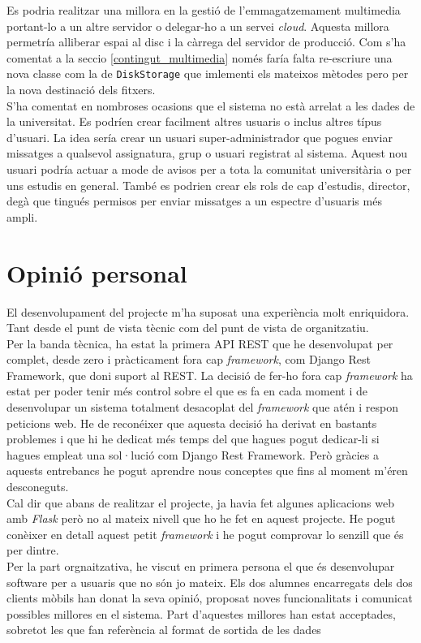 Es podria realitzar una millora en la gestió de  l'emmagatzemament multimedia portant-lo a un altre servidor o delegar-ho a un servei   \emph{cloud}. Aquesta millora permetría alliberar espai al disc i la càrrega del servidor de producció. Com s'ha comentat a la seccio \ref{contingut_multimedia} només faría falta re-escriure una nova classe com la de \texttt{DiskStorage} que imlementi els mateixos mètodes pero per la nova destinació dels fitxers.\\

S'ha comentat en nombroses ocasions que el sistema no està arrelat a les dades de la universitat. Es podríen crear facilment altres usuaris o inclus altres típus d'usuari. La idea sería crear un usuari super-administrador que pogues enviar missatges a qualsevol assignatura, grup o usuari registrat al sistema. Aquest nou usuari podría actuar a mode de avisos per a tota la comunitat universitària o per uns estudis en general. També es podrien crear els rols de cap d'estudis, director, degà que tingués permisos per enviar missatges a un espectre d'usuaris més ampli.


\section{Opinió personal}

El desenvolupament del projecte m'ha suposat una experiència molt enriquidora. Tant desde el punt de vista tècnic com del punt de vista de organitzatiu.\\

Per la banda tècnica, ha estat la primera \ac{API} \ac{REST} que he desenvolupat per complet, desde zero i pràcticament fora cap \emph{framework}, com Django Rest Framework\cite{djangorestframework},  que doni suport al \ac{REST}. La decisió de fer-ho fora cap \emph{framework} ha estat per poder tenir més control sobre el que es fa en cada moment i de desenvolupar un sistema totalment desacoplat del \emph{framework} que atén i respon peticions web. He de reconéixer que aquesta decisió ha derivat en bastants problemes i que hi he dedicat més temps del que hagues pogut dedicar-li si hagues empleat una sol·lució com Django Rest Framework. Però gràcies a aquests entrebancs he pogut aprendre nous conceptes que fins al moment m'éren desconeguts.\\

Cal dir que abans de realitzar el projecte, ja havia fet algunes aplicacions web amb \emph{Flask} però no al mateix nivell que ho he fet en aquest projecte. He pogut conèixer en detall aquest petit \emph{framework} i he pogut comprovar lo senzill que és per dintre. \\


Per la part orgnaitzativa, he viscut en primera persona el que és desenvolupar software per a usuaris que no són jo mateix. Els dos alumnes encarregats dels dos clients mòbils han donat la seva opinió, proposat noves funcionalitats i comunicat possibles millores en el sistema. Part d'aquestes millores han estat acceptades, sobretot les que fan referència al format de sortida de les dades

